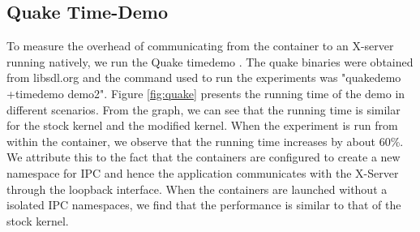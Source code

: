 \subsection{Quake Time-Demo}
To measure the overhead of communicating from the container to an X-server running natively, we run the Quake timedemo . The quake binaries were obtained from libsdl.org  and the command used to run the experiments was "quakedemo +timedemo demo2". Figure \ref{fig:quake} presents the running time of the demo in different scenarios. From the graph, we can see that the running time is similar for the stock kernel and the modified kernel. When the experiment is run from within the container, we observe that the running time increases by about 60\%. We attribute this to the fact that the containers are configured to create a new namespace for IPC and hence the application communicates with the X-Server through the loopback interface. When the containers are launched without a isolated IPC namespaces, we find that the performance is similar to that of the stock kernel.
